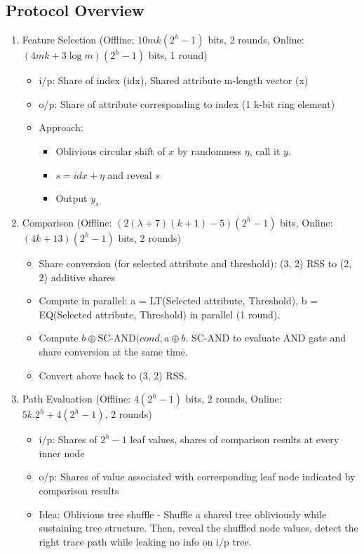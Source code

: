 \subsection{Protocol Overview}
\begin{enumerate}
    \item Feature Selection (Offline: $10mk(2^h - 1)$ bits, 2 rounds, Online: $(4mk + 3\log m)(2^h - 1)$ bits, 1 round)
    \begin{itemize}
        \item i/p: Share of index (idx), Shared attribute m-length vector (x)
        \item o/p: Share of attribute corresponding to index (1 k-bit ring element)
        \item Approach:
        \begin{itemize}
            \item Oblivious circular shift of $x$ by randomness $\eta$, call it $y$.
            \item $s = idx + \eta$ and reveal $s$
            \item Output $y_s$
        \end{itemize}
    \end{itemize}
    \item Comparison (Offline: $(2(\lambda+7)(k+1) - 5)(2^h - 1)$ bits, Online: $(4k+13)(2^h - 1)$ bits, 2 rounds)
    \begin{itemize}
        \item Share conversion (for selected attribute and threshold): (3, 2) RSS to (2, 2) additive shares
        \item Compute in parallel: a = LT(Selected attribute, Threshold), b = EQ(Selected attribute, Threshold) in parallel (1 round).
        \item Compute $b \oplus \text{SC-AND}(cond, a \oplus b$. SC-AND to evaluate AND gate and share conversion at the same time.
        \item Convert above back to (3, 2) RSS.
    \end{itemize}
    \item Path Evaluation (Offline: $4(2^h - 1)$ bits, 2 rounds, Online: $5k.2^h + 4(2^h - 1)$, 2 rounds)
    \begin{itemize}
        \item i/p: Shares of $2^h - 1$ leaf values, shares of comparison results at every inner node
        \item o/p: Shares of value associated with corresponding leaf node indicated by comparison results
        \item Idea: Oblivious tree shuffle - Shuffle a shared tree obliviously while sustaining tree structure. Then, reveal the shuffled node values, detect the right trace path while leaking no info on i/p tree.

\end{itemize}
\end{enumerate}
